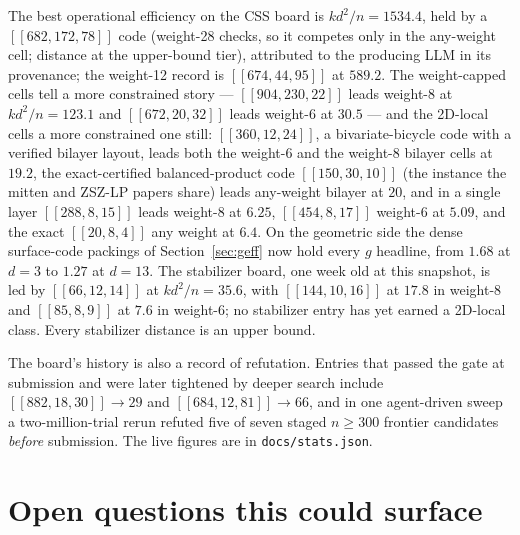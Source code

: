 \documentclass[11pt]{article}
\newcommand{\eff}{kd^2/n}
\begin{document}
	The best operational efficiency on the CSS board is $\eff=1534.4$, held
	by a $[[682,172,78]]$ code (weight-28 checks, so it competes only in
	the any-weight cell; distance at the upper-bound tier), attributed to
	the producing LLM in its provenance; the weight-12 record is
	$[[674,44,95]]$ at $589.2$. The weight-capped cells tell a more
	constrained story --- $[[904,230,22]]$ leads weight-8 at $\eff=123.1$
	and $[[672,20,32]]$ leads weight-6 at $30.5$ --- and the 2D-local cells
	a more constrained one still: $[[360,12,24]]$, a bivariate-bicycle code
	with a verified bilayer layout, leads both the weight-6 and the weight-8
	bilayer cells at $19.2$, the exact-certified balanced-product code
	$[[150,30,10]]$ (the instance the mitten and ZSZ-LP papers share)
	leads any-weight bilayer at $20$, and in a single layer
	$[[288,8,15]]$ leads weight-8 at $6.25$, $[[454,8,17]]$ weight-6 at
	$5.09$, and the exact $[[20,8,4]]$ any weight at $6.4$. On the geometric
	side the dense surface-code packings of Section~\ref{sec:geff} now hold
	every $g$ headline, from $1.68$ at $d=3$ to $1.27$ at $d=13$. The
	stabilizer board, one week old at this snapshot, is led by
	$[[66,12,14]]$ at $\eff=35.6$, with $[[144,10,16]]$ at $17.8$ in
	weight-8 and $[[85,8,9]]$ at $7.6$ in weight-6; no stabilizer entry has
	yet earned a 2D-local class. Every stabilizer distance is an upper
	bound.

	The board's history is also a record of refutation. Entries that passed
	the gate at submission and were later tightened by deeper search
	include $[[882,18,30]]\to29$ and $[[684,12,81]]\to66$, and in one
	agent-driven sweep a two-million-trial rerun refuted five of seven
	staged $n\ge300$ frontier candidates \emph{before} submission. The live
	figures are in \texttt{docs/stats.json}.

	\section{Open questions this could surface}
	\label{sec:open}
\end{document}
